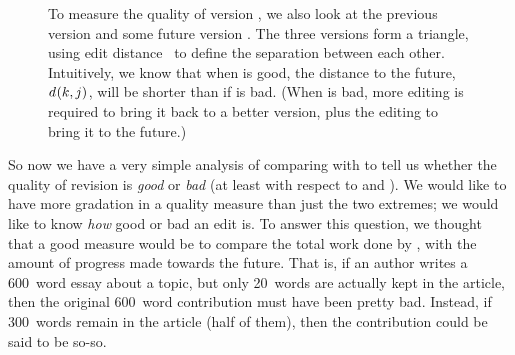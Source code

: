 \begin{figure}[t]
\centering
{}
\hspace{1ex}
\caption[Edit distance triangles allow us to compute quality]{
        To measure the quality of version , we also
	look at the previous version  and some future
	version .
	The three versions form a triangle, using
	edit distance~\cite{Damerau1964,Levenshtein1966} to
        define the separation between each other.
	Intuitively, we know that when  is good,
	the distance to the future, $d_{}(k, j)$,
	will be shorter than if  is bad.
	(When  is bad, more editing is required to
	bring it back to a better version, plus the editing
	to bring it to the future.)
}
\label{fig-editcontr}
\end{figure}

So now we have a very simple analysis of comparing
 with  to tell us whether the
quality of revision  is \textit{good} or \textit{bad}
(at least with respect to  and ).
We would like to have more gradation in a quality measure than
just the two extremes; we would like to know \textit{how} good
or bad an edit is.
To answer this question, we thought that a good measure would
be to compare the total work done by ,
with the amount of progress made towards the future.
That is, if an author writes a 600~word essay about a topic,
but only 20~words are actually kept in the article, then the
original 600~word contribution must have been pretty bad.
Instead, if 300~words remain in the article (half of them),
then the contribution could be said to be so-so.

